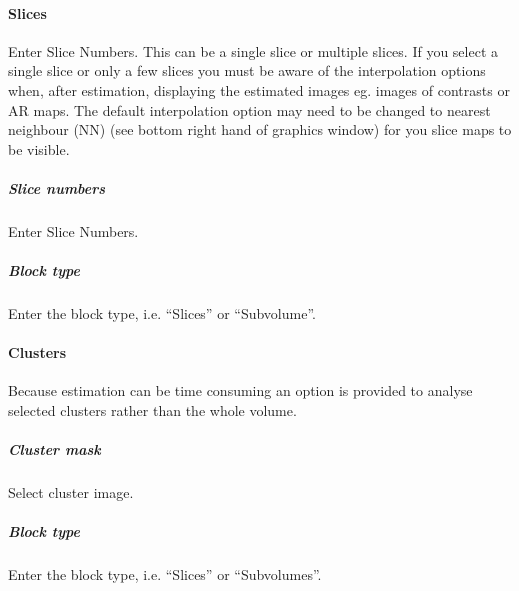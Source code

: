 \paragraph{Slices}

Enter Slice Numbers. This can be a single slice or multiple slices. If you select a single slice or only a few slices you must be aware of the interpolation options when, after estimation, displaying the estimated images eg. images of contrasts or AR maps. The default interpolation option may need to be changed to nearest neighbour (NN) (see bottom right hand of graphics window) for you slice maps to be visible.

\subparagraph{Slice numbers}

Enter Slice Numbers.

\subparagraph{Block type}

Enter the block type, i.e. ``Slices'' or ``Subvolume''.

\paragraph{Clusters}

Because estimation can be time consuming an option is provided to analyse selected clusters rather than the whole volume.

\subparagraph{Cluster mask}

Select cluster image.

\subparagraph{Block type}

Enter the block type, i.e. ``Slices'' or ``Subvolumes''.

